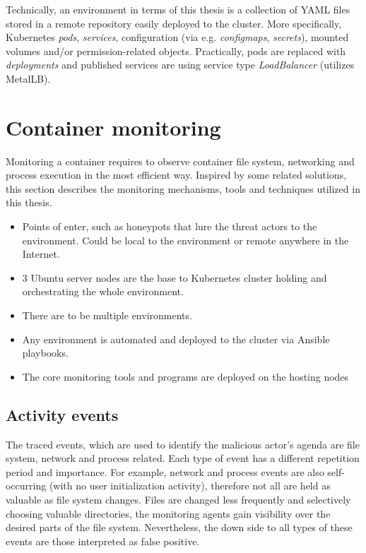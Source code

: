 Technically, an environment in terms of this thesis is a collection of YAML files stored in a remote repository easily deployed to the cluster. More specifically, Kubernetes \textit{pods}, \textit{services}, configuration (via e.g. \textit{configmaps}, \textit{secrets}), mounted volumes and/or permission-related objects. Practically, pods are replaced with \textit{deployments} and published services are using service type \textit{LoadBalancer} (utilizes MetalLB).


\section{Container monitoring \label{design:con-mon}}
Monitoring a container requires to observe container file system, networking and process execution in the most efficient way. Inspired by some related solutions, this section describes the monitoring mechanisms, tools and techniques utilized in this thesis.

\begin{itemize}[noitemsep]
	\item 
	Points of enter, such as honeypots that lure the threat actors to the environment. Could be local to the environment or remote anywhere in the Internet.
	\item 
	3 Ubuntu server nodes are the base to Kubernetes cluster holding and orchestrating the whole environment.
	\item 
	There are to be multiple environments.
	\item
	Any environment is automated and deployed to the cluster via Ansible playbooks.
	\item 
	The core monitoring tools and programs are deployed on the hosting nodes
\end{itemize}

\subsection{Activity events \label{design:mon:events}}
The traced events, which are used to identify the malicious actor's agenda are file system, network and process related. Each type of event has a different repetition period and importance. For example, network and process events are also self-occurring (with no user initialization activity), therefore not all are held as valuable as file system changes. Files are changed less frequently and selectively choosing valuable directories, the monitoring agents gain visibility over the desired parts of the file system. Nevertheless, the down side to all types of these events are those interpreted as false positive.

